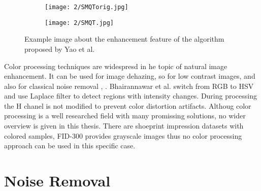 \documentclass[draft,final]{vutinfth} %
\begin{document}
\begin{figure}[h]
  \centering
  \begin{subfigure}[b]{0.4\columnwidth}
    \centering
    \texttt{[image: 2/SMQTorig.jpg]}
    \label{fig:rw:BHNMTin}
  \end{subfigure}
  \begin{subfigure}[b]{0.4\columnwidth}
    \centering
    \texttt{[image: 2/SMQT.jpg]}
    \label{fig:rw:BHNMTout}
  \end{subfigure}
  \caption{Example image  \cite{yao2016image} about the enhancement feature of the algorithm proposed by Yao et al. \cite{yao2016image} }
  \label{fig:rw:BHNMT} %
\end{figure}

\par
Color processing techniques are widespresd in he topic of natural image enhancement.
It can be used for image dehazing, so for low contrast images, \cite{singh2018dehazing} and also for classical noise removal \cite{ren2018joint}, \cite{zhang2016simultaneous}. 
Bhairannawar et al. \cite{bhairannawar2017color} switch from RGB to HSV and use Laplace filter to detect regions with intensity changes. 
During processing the H chanel is not modified to prevent color distortion artifacts.
Althoug color processing is a well researched field with many promissing solutions, no wider overview is given in this thesis.
There are shoeprint impression datasets with colored samples, FID-300 provides grayscale images thus no color processing approach can be used in this specific case. 

\section{Noise Removal}
\end{document}
